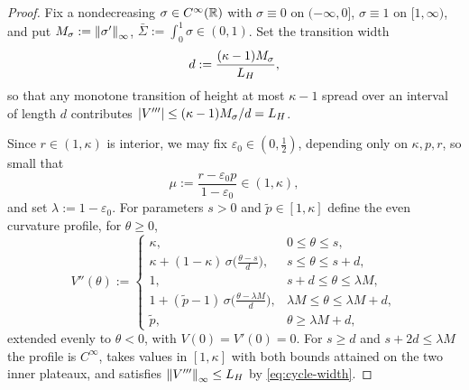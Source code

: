 \begin{proof}
    Fix a nondecreasing $\sigma\in C^\infty(\mathbb{R})$ with $\sigma\equiv0$ on $(-\infty,0]$,
    $\sigma\equiv1$ on $[1,\infty)$, and put $M_\sigma:=\left\lVert \sigma'\right\rVert_\infty$,
    $\bar\Sigma:=\int_0^1\sigma\in(0,1)$. Set the transition width
    \begin{equation}\label{eq:cycle-width}
        d:=\frac{(\kappa-1)M_\sigma}{L_H},
    \end{equation}
    so that any monotone transition of height at most $\kappa-1$ spread over an interval of
    length $d$ contributes $|V'''|\leq(\kappa-1)M_\sigma/d=L_H$.

    Since $r\in(1,\kappa)$ is interior, we may fix $\varepsilon_0\in(0,\tfrac12)$, depending
    only on $\kappa,p,r$, so small that
    \begin{equation}\label{eq:cycle-mu}
        \mu:=\frac{r-\varepsilon_0p}{1-\varepsilon_0}\in(1,\kappa),
    \end{equation}
    and set $\lambda:=1-\varepsilon_0$. For parameters $s>0$ and $\tilde p\in[1,\kappa]$
    define the even curvature profile, for $\theta\geq0$,
    \begin{equation}\label{eq:cycle-profile}
        V''(\theta):=
        \begin{cases}
            \kappa, & 0\leq\theta\leq s,\\
            \kappa+(1-\kappa)\,\sigma\bigl(\tfrac{\theta-s}d\bigr), & s\leq\theta\leq s+d,\\
            1, & s+d\leq\theta\leq\lambda M,\\
            1+(\tilde p-1)\,\sigma\bigl(\tfrac{\theta-\lambda M}d\bigr), & \lambda M\leq\theta\leq\lambda M+d,\\
            \tilde p, & \theta\geq\lambda M+d,
        \end{cases}
    \end{equation}
    extended evenly to $\theta<0$, with $V(0)=V'(0)=0$. For $s\geq d$ and
    $s+2d\leq\lambda M$ the profile is $C^\infty$, takes values in $[1,\kappa]$ with both
    bounds attained on the two inner plateaux, and satisfies
    $\left\lVert V'''\right\rVert_\infty\leq L_H$ by \eqref{eq:cycle-width}.


\end{proof}
